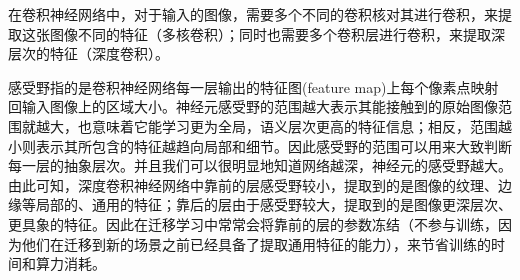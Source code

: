


在卷积神经网络中，对于输入的图像，需要多个不同的卷积核对其进行卷积，来提取这张图像不同的特征（多核卷积）；同时也需要多个卷积层进行卷积，来提取深层次的特征（深度卷积）。

感受野指的是卷积神经网络每一层输出的特征图(feature map)上每个像素点映射回输入图像上的区域大小。神经元感受野的范围越大表示其能接触到的原始图像范围就越大，也意味着它能学习更为全局，语义层次更高的特征信息；相反，范围越小则表示其所包含的特征越趋向局部和细节。因此感受野的范围可以用来大致判断每一层的抽象层次。并且我们可以很明显地知道网络越深，神经元的感受野越大。由此可知，深度卷积神经网络中靠前的层感受野较小，提取到的是图像的纹理、边缘等局部的、通用的特征；靠后的层由于感受野较大，提取到的是图像更深层次、更具象的特征。因此在迁移学习中常常会将靠前的层的参数冻结（不参与训练，因为他们在迁移到新的场景之前已经具备了提取通用特征的能力），来节省训练的时间和算力消耗。
